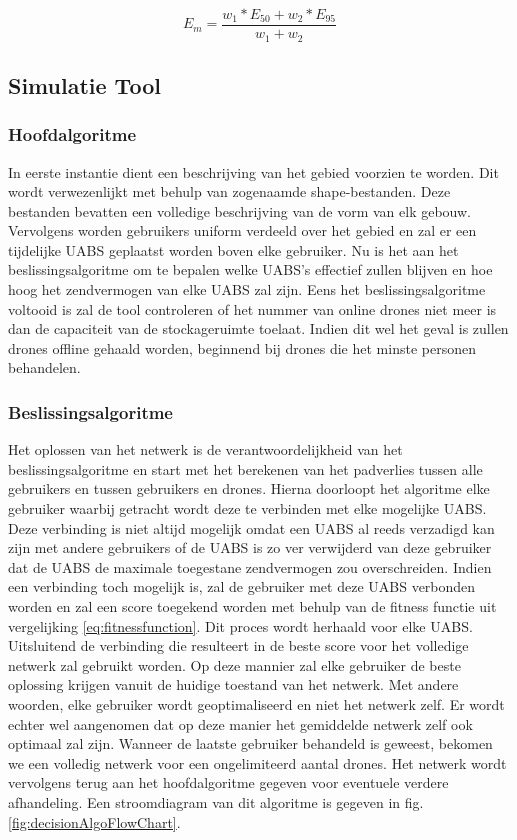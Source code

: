 \documentclass[twocolumn]{phdsymp_dutch}
\begin{document}
\begin{equation} 
E_m = \frac{w_1 * E_{50} + w_2 * E_{95}}{w_1 + w_2}
\label{eq:em}
\end{equation}
\newline
\subsection{Simulatie Tool}

\subsubsection{Hoofdalgoritme}
In eerste instantie dient een beschrijving van het gebied voorzien te worden. Dit wordt verwezenlijkt met behulp van 
zogenaamde shape-bestanden. Deze bestanden bevatten een volledige beschrijving van de vorm van elk gebouw. Vervolgens 
worden gebruikers uniform verdeeld over het gebied en zal er een tijdelijke \gls{UABS} geplaatst worden boven elke gebruiker.
Nu is het aan het beslissingsalgoritme om te bepalen welke \gls{UABS}'s effectief zullen blijven en hoe hoog het zendvermogen van elke \gls{UABS}
zal zijn. Eens het beslissingsalgoritme voltooid is zal de tool controleren of het nummer van online drones niet meer is dan 
de capaciteit van de stockageruimte toelaat. Indien dit wel het geval is zullen drones offline gehaald worden, beginnend bij 
drones die het minste personen behandelen.

\subsubsection{Beslissingsalgoritme}

Het oplossen van het netwerk is de verantwoordelijkheid van het beslissingsalgoritme en start met het berekenen van het padverlies tussen 
alle gebruikers en tussen gebruikers en drones. Hierna doorloopt het algoritme elke gebruiker waarbij getracht wordt deze te verbinden 
met elke mogelijke \gls{UABS}. Deze verbinding is niet altijd mogelijk omdat een \gls{UABS} al reeds verzadigd kan zijn met andere gebruikers of 
de \gls{UABS} is zo ver verwijderd van deze gebruiker dat de \gls{UABS} de maximale toegestane zendvermogen zou overschreiden.
Indien een verbinding toch mogelijk is, zal de gebruiker met deze \gls{UABS} verbonden worden en zal een score toegekend worden met behulp van 
de fitness functie uit vergelijking \ref{eq:fitnessfunction}. 
Dit proces wordt herhaald voor elke \gls{UABS}. Uitsluitend de verbinding die resulteert in de beste score voor het volledige netwerk 
zal gebruikt worden. 
Op deze mannier zal elke gebruiker de beste oplossing krijgen vanuit de huidige toestand van het netwerk.
Met andere woorden, elke gebruiker wordt geoptimaliseerd en niet het netwerk zelf. Er wordt echter wel aangenomen dat 
op deze manier het gemiddelde netwerk zelf ook optimaal zal zijn.
Wanneer de laatste gebruiker behandeld is geweest, bekomen we een volledig netwerk voor een ongelimiteerd aantal drones.
Het netwerk wordt vervolgens terug aan het hoofdalgoritme gegeven voor eventuele verdere afhandeling.
Een stroomdiagram van dit algoritme is gegeven in fig. \ref{fig:decisionAlgoFlowChart}.
\end{document}
